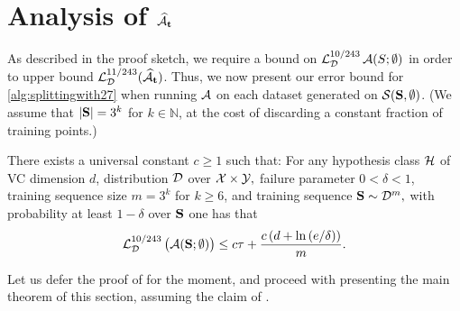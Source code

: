 \section{Analysis of $\widehat{\mathcal{A}}_{\mathbf{t}}$}

As described in the proof sketch, we require a bound on $\operatorname{\mathcal{L}}_{\mathcal{D}}^{10/243}\mathcal{A}(S;\emptyset)$ in order to upper bound $ \operatorname{\mathcal{L}}_{\mathcal{D}}^{11/243}(\widehat{\mathcal{A}}_{\mathbf{t}})$.  
Thus, we now present our error bound for \cref{alg:splittingwith27} when running $ \mathcal{A} $ on each dataset generated on $\mathcal{S}(\mathbf{S},\emptyset)$. (We assume that $ |\mathbf{S}| =3^{k}$ for $ k\in\mathbb{N}$, at the cost of discarding a constant fraction of training points.)       


\begin{lemma}\label{lem:upperbound}
    There exists a universal constant $ c \geq 1$ such that: For any hypothesis class $ \mathcal{H} $ of VC dimension $ d $, distribution $ \mathcal{D} $ over $ \mathcal{X}\times\mathcal{Y},$ failure parameter $ 0<\delta<1 $, training sequence size $ m=3^{k} $ for $ k\geq 6 $, and training sequence $  \mathbf{S}\sim \mathcal{D}^{m},$ with probability at least $ 1-\delta $ over $ \mathbf{S} $ one has that  
    \begin{align*}
        \operatorname{\mathcal{L}}_{\mathcal{D}}^{10/243}\big(\mathcal{A}(\mathbf{S};\emptyset)\big)  
        \leq c\tau+\frac{c\left(d+\ln{(e/\delta )}\right)}{m}.
    \end{align*}
\end{lemma}

Let us defer the proof of  
for the moment, and proceed with presenting the main theorem of this section, assuming the claim of . 

